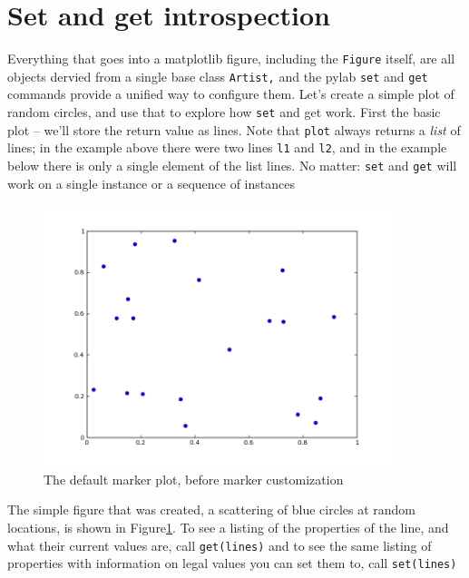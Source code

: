 \section[set and get]{Set and get introspection}

Everything that goes into a matplotlib figure, including the \texttt{Figure}
itself, are all objects dervied from a single base class \texttt{Artist,}
and the pylab \texttt{set} and \texttt{get} commands provide a unified
way to configure them. Let's create a simple plot of random circles,
and use that to explore how \texttt{set} and get work. First the basic
plot -- we'll store the return value as lines. Note that \texttt{plot}
always returns a \textit{list} of lines; in the example above there
were two lines \texttt{l1} and \texttt{l2}, and in the example below
there is only a single element of the list lines. No matter: \texttt{set}
and \texttt{get} will work on a single instance or a sequence of instances



%
\begin{figure}
\begin{centering}
\includegraphics[width=4in]{fig/mpl_set_get1}
\par\end{centering}

\caption{\label{fig:mpl_setget1}The default marker plot, before marker customization}

\end{figure}


The simple figure that was created, a scattering of blue circles at
random locations, is shown in Figure\ref{fig:mpl_setget1}. To see
a listing of the properties of the line, and what their current values
are, call \texttt{get(lines)} 
and to see the same listing of properties with information on legal
values you can set them to, call \texttt{set(lines)}

